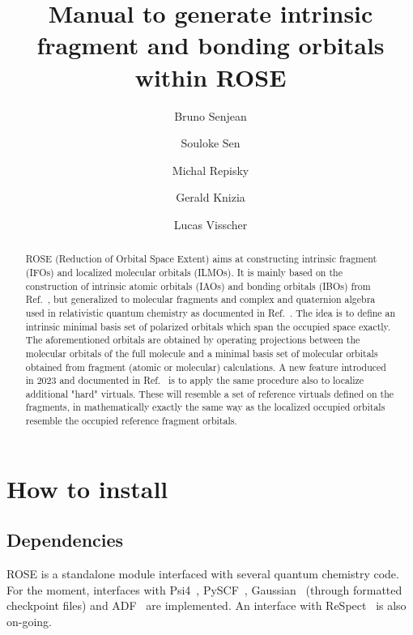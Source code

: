 \documentclass[preprint]{revtex4-1}
\begin{document}
\title{Manual to generate intrinsic fragment and bonding orbitals within ROSE
}

\author{Bruno Senjean}
\author{Souloke Sen}
\author{Michal Repisky}
\author{Gerald Knizia}
\author{Lucas Visscher}


\begin{abstract}
ROSE (Reduction of Orbital Space Extent) aims at constructing intrinsic fragment (IFOs)
and localized molecular orbitals (ILMOs).
It is mainly based on the construction of intrinsic atomic orbitals
(IAOs) and bonding orbitals (IBOs) from Ref.~\cite{knizia2013intrinsic}, but generalized to molecular fragments
and complex and quaternion algebra used in relativistic quantum chemistry as documented in Ref.~\cite{ROSE1}.
The idea is to define an intrinsic minimal basis set
of polarized orbitals which span the occupied space
exactly. The aforementioned orbitals are obtained by operating projections
between the molecular orbitals of the full molecule
and a minimal basis set of molecular orbitals obtained from
fragment (atomic or molecular) calculations.
A new feature introduced in 2023 and documented in  Ref.~\cite{ROSE2} is to apply the same procedure
also to localize additional "hard" virtuals. These will resemble a set of reference virtuals defined on the fragments,
in mathematically exactly the same way as the localized occupied orbitals resemble the occupied reference fragment orbitals.
\end{abstract}

\maketitle

\tableofcontents

\section{How to install}

\subsection{Dependencies}

ROSE is a standalone module 
interfaced with several quantum chemistry code.
For the moment, interfaces with 
Psi4~\cite{psi4}, PySCF~\cite{pyscf}, Gaussian~\cite{Gaussian09} (through formatted checkpoint files) and ADF~\cite{AMS19}
are implemented. An interface with ReSpect~\cite{respect}
is also on-going.
\end{document}
